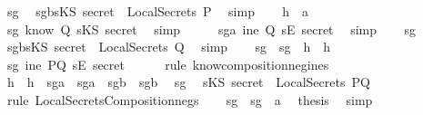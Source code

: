 \begin{isabellebody}
\ sg{}\ \isamarkupfalse%
\ sg{}b{\isacharcolon}{\isachardoublequoteopen}sKS\ secret\ {\isasymnotin}\ LocalSecrets\ P{\isachardoublequoteclose}\ \isamarkupfalse%
\ simp\isanewline
\ \ \isamarkupfalse%
\ h{}\ \ a{}\ \isamarkupfalse%
\ sg{}{\isacharcolon}{\isachardoublequoteopen}{\isasymnot}\ know\ Q\ {\isacharparenleft}sKS\ secret{\isacharparenright}{\isachardoublequoteclose}\ \isamarkupfalse%
\ simp\isanewline
\ \ \isamarkupfalse%
\ \isamarkupfalse%
\ sg{}a{\isacharcolon}{\isachardoublequoteopen}{\isasymnot}\ ine\ Q\ {\isacharparenleft}sE\ secret{\isacharparenright}{\isachardoublequoteclose}\ \isamarkupfalse%
\ simp\isanewline
\ \ \isamarkupfalse%
\ sg{}\ \isamarkupfalse%
\ sg{}b{\isacharcolon}{\isachardoublequoteopen}sKS\ secret\ {\isasymnotin}\ LocalSecrets\ Q{\isachardoublequoteclose}\ \isamarkupfalse%
\ simp\isanewline
\ \ \isamarkupfalse%
\ sg{}\ \ sg{}\ \ h{}\ \ h{}\ \isamarkupfalse%
\ sg{}{\isacharcolon}{\isachardoublequoteopen}{\isasymnot}\ ine\ PQ\ {\isacharparenleft}sE\ secret{\isacharparenright}{\isachardoublequoteclose}\isanewline
\ \ \ \ \isamarkupfalse%
\ {\isacharparenleft}rule\ know{\isacharunderscore}composition{\isacharunderscore}neg{\isacharunderscore}ine{\isacharunderscore}s{\isacharparenright}\ \isanewline
\ \ \isamarkupfalse%
\ h{}\ \ h{}\ \ sg{}a\ \ sg{}a\ \ sg{}b\ \ sg{}b\ \isamarkupfalse%
\ sg{}{\isacharcolon}\isanewline
\ \ {\isachardoublequoteopen}sKS\ secret\ {\isasymnotin}\ LocalSecrets\ PQ{\isachardoublequoteclose}\ \ \isanewline
\ \ \ \ \isamarkupfalse%
\ {\isacharparenleft}rule\ LocalSecretsComposition{\isacharunderscore}neg{}{\isacharunderscore}s{\isacharparenright}\isanewline
\ \ \isamarkupfalse%
\ sg{}\ \ sg{}\ \ a{}\ \isamarkupfalse%
\ {\isacharquery}thesis\ \isamarkupfalse%
\ simp\isanewline
{}\isamarkupfalse%
%
\endisatagproof
{\isafoldproof}%

\end{isabellebody}
